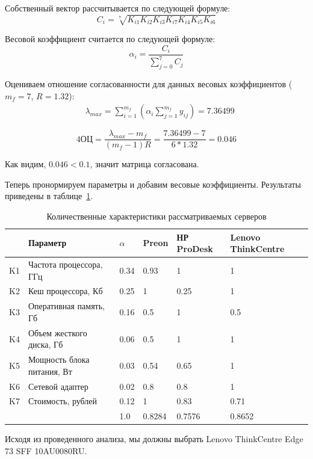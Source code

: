 \documentclass[russian,utf8,emptystyle]{eskdtext}
\begin{document}
Собственный вектор рассчитывается по следующей формуле:
$$
C_i = \sqrt[7]{K_{i1} K_{i2} K_{i3} K_{i7} K_{i4} K_{i5} K_{i6}}
$$

Весовой коэффициент считается по следующей формуле:
$$
\alpha_i = \frac{C_i}{\sum_{j=0}^{7} C_j}
$$

Оцениваем отношение согласованности для данных весовых коэффициентов ($m_f=7$, $R=1.32$):
\begin{align*}
&\lambda_{max} = \sum_{i=1}^{m_f}(\alpha_i \sum_{j=1}^{m_f} y_{ij}) = 7.36499
\end{align*}

$$4
\text{ОЦ} = \frac{\lambda_{max} - m_f}{(m_f - 1)R} = \frac{7.36499 - 7}{6*1.32} = 0.046
$$

Как видим, $0.046 < 0.1$, значит матрица согласована.

Теперь пронормируем параметры и добавим весовые коэффициенты. Результаты приведены в таблице~\ref{tab:server-4}.

\begin{longtable}{p{1cm}|p{7cm}|p{1cm}|p{2cm}|p{2cm}|p{2cm}}
\caption{Количественные характеристики рассматриваемых серверов}
\label{tab:server-4} \\
            & Параметр                     & $\alpha$ & Preon      & НР ProDesk & Lenovo ThinkCentre \\ 
\hline 
K1          & Частота процессора, ГГц      & 0.34     & 0.93       & 1          & 1        \\ 
K2          & Кеш процессора, Кб           & 0.25     & 1          & 0.25       & 1        \\
K3          & Оперативная память, Гб       & 0.16     & 0.5        & 1          & 0.5      \\ 
K4          & Объем жесткого диска, Гб     & 0.06     & 0.5        & 1          & 1        \\ 
K5          & Мощность блока питания, Вт   & 0.03     & 0.54       & 0.65       & 1        \\ 
K6          & Сетевой адаптер              & 0.02     & 0.8        & 0.8        & 1        \\ 
K7          & Стоимость, рублей            & 0.12     & 1          & 0.83       & 0.71     \\
\hline
			&							   & 1.0      & 0.8284     & 0.7576     & 0.8652
\end{longtable}

Исходя из проведенного анализа, мы должны выбрать Lenovo ThinkCentre Edge 73 SFF 10AU0080RU.
\end{document}
